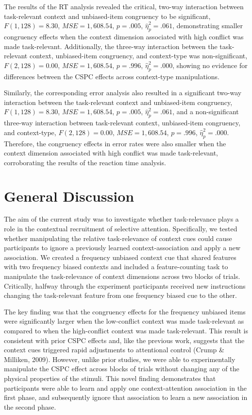 \documentclass[english,,man,floatsintext]{apa6}
\begin{document}
The results of the RT analysis revealed the critical, two-way
interaction between task-relevant context and unbiased-item congruency
to be significant, \(F(1, 128) = 8.30\), \(\mathit{MSE} = 1,608.54\),
\(p = .005\), \(\hat{\eta}^2_p = .061\), demonstrating smaller
congruency effects when the context dimension associated with high
conflict was made task-relevant. Additionally, the three-way interaction
between the task-relevant context, unbiased-item congruency, and
context-type was non-significant, \(F(2, 128) = 0.00\),
\(\mathit{MSE} = 1,608.54\), \(p = .996\), \(\hat{\eta}^2_p = .000\),
showing no evidence for differences between the CSPC effects across
context-type manipulations.

Similarly, the corresponding error analysis also resulted in a
significant two-way interaction between the task-relevant context and
unbiased-item congruency, \(F(1, 128) = 8.30\),
\(\mathit{MSE} = 1,608.54\), \(p = .005\), \(\hat{\eta}^2_p = .061\),
and a non-significant three-way interaction between task-relevant
context, unbiased-item congruency, and context-type,
\(F(2, 128) = 0.00\), \(\mathit{MSE} = 1,608.54\), \(p = .996\),
\(\hat{\eta}^2_p = .000\). Therefore, the congruency effects in error
rates were also smaller when the context dimension associated with high
conflict was made task-relevant, corroborating the results of the
reaction time analysis.

\section{General Discussion}\label{general-discussion}

The aim of the current study was to investigate whether task-relevance
plays a role in the contextual recruitment of selective attention.
Specifically, we tested whether manipulating the relative task-relevance
of context cues could cause participants to ignore a previously learned
context-association and apply a new association. We created a frequency
unbiased context cue that shared features with two frequency biased
contexts and included a feature-counting task to manipulate the
task-relevance of context dimensions across two blocks of trials.
Critically, halfway through the experiment participants received new
instructions changing the task-relevant feature from one frequency
biased cue to the other.

The key finding was that the congruency effects for the frequency
unbiased items were significantly larger when the low-conflict context
was made task-relevant as compared to when the high-conflict context was
made task-relevant. This result is consistent with prior CSPC effects
and, like the previous work, suggests that the context cues triggered
rapid adjustments to attentional control (Crump \& Milliken, 2009).
However, unlike prior studies, we were able to experimentally manipulate
the CSPC effect across blocks of trials without changing any of the
physical properties of the stimuli. This novel finding demonstrates that
participants were able to learn and apply one context-attention
association in the first phase, and subsequently ignore that association
to learn a new association in the second phase.
\end{document}
